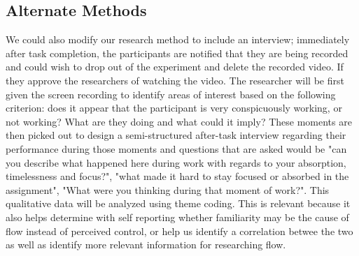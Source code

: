 \documentclass{article}
\begin{document}
\subsection{Alternate Methods}
%
We could also modify our research method to include an interview; immediately after task completion, the participants are notified that they are being recorded and could wish to drop out of the experiment and delete the recorded video. If they approve the researchers of watching the video. The researcher will be first given the screen recording to identify areas of interest based on the following criterion: does it appear that the participant is very conspicuously working, or not working? What are they doing and what could it imply? These moments are then picked out to design a semi-structured after-task interview regarding their performance during those moments and questions that are asked would be "can you describe what happened here during work with regards to your absorption, timelessness and focus?", "what made it hard to stay focused or absorbed in the assignment", "What were you thinking during that moment of work?". This qualitative data will be analyzed using theme coding. This is relevant because it also helps determine with self reporting whether familiarity may be the cause of flow instead of perceived control, or help us identify a correlation betwee the two as well as identify more relevant information for researching flow. 


%
%
%
\end{document}
